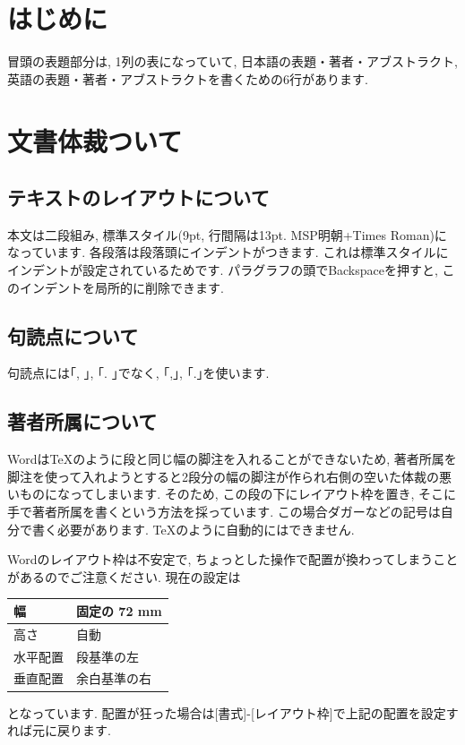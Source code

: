 \documentclass[a4paper,9pt]{extarticle}
\begin{document}
\maketitle

\begin{multicols}{2}

\section{はじめに}
冒頭の表題部分は, 1列の表になっていて, 日本語の表題・著者・アブストラクト, 英語の表題・著者・アブストラクトを書くための6行があります. 

\section{文書体裁ついて}

\subsection{テキストのレイアウトについて}
本文は二段組み, 標準スタイル(9pt, 行間隔は13pt. MSP明朝+Times Roman)になっています.  
各段落は段落頭にインデントがつきます. これは標準スタイルにインデントが設定されているためです. パラグラフの頭でBackspaceを押すと, このインデントを局所的に削除できます. 

\subsection{句読点について}
句読点には｢, ｣, ｢. ｣でなく, ｢,｣, ｢.｣を使います. 

\subsection{著者所属について}
WordはTeXのように段と同じ幅の脚注を入れることができないため, 著者所属を脚注を使って入れようとすると2段分の幅の脚注が作られ右側の空いた体裁の悪いものになってしまいます. そのため, この段の下にレイアウト枠を置き, そこに手で著者所属を書くという方法を採っています. この場合ダガーなどの記号は自分で書く必要があります. TeXのように自動的にはできません. 

Wordのレイアウト枠は不安定で,  ちょっとした操作で配置が換わってしまうことがあるのでご注意ください. 現在の設定は

\noindent
\begin{tabularx}{\linewidth}{|X|X|}
    \hline
    幅 & 固定の 72 mm \\
    \hline
    高さ & 自動 \\
    \hline
    水平配置 & 段基準の左 \\
    \hline
    垂直配置 & 余白基準の右 \\
    \hline
\end{tabularx}
となっています. 配置が狂った場合は[書式]-[レイアウト枠]で上記の配置を設定すれば元に戻ります. 


\end{multicols}
\end{document}
